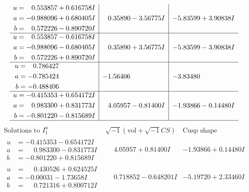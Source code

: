 \documentclass[1p]{elsarticle_modified}
\theoremstyle{definition}
\newcommand{\I}{\sqrt{-1}}
\begin{document}
$$\begin{array}{c|c|c}
\begin{aligned}
u &= \phantom{-}0.553857 + 0.616758 I \\
a &= -0.988096 + 0.680405 I \\
b &= \phantom{-}0.572226 - 0.890720 I\end{aligned}
 & \phantom{-}0.35890 - 3.56775 I & -5.83599 + 3.90838 I \\ \hline\begin{aligned}
u &= \phantom{-}0.553857 - 0.616758 I \\
a &= -0.988096 - 0.680405 I \\
b &= \phantom{-}0.572226 + 0.890720 I\end{aligned}
 & \phantom{-}0.35890 + 3.56775 I & -5.83599 - 3.90838 I \\ \hline\begin{aligned}
u &= \phantom{-}0.786427\phantom{ +0.000000I} \\
a &= -0.785424\phantom{ +0.000000I} \\
b &= -0.488406\phantom{ +0.000000I}\end{aligned}
 & -1.56406\phantom{ +0.000000I} & -3.83480\phantom{ +0.000000I} \\ \hline\begin{aligned}
u &= -0.415353 + 0.654172 I \\
a &= \phantom{-}0.983300 + 0.831773 I \\
b &= -0.801220 - 0.815689 I\end{aligned}
 & \phantom{-}4.05957 - 0.81400 I & -1.93866 - 0.14480 I\\
 \hline 
 \end{array}$$\newpage$$\begin{array}{c|c|c}  
\text{Solutions to }I^u_{1}& \I (\text{vol} + \sqrt{-1}CS) & \text{Cusp shape}\\
 \hline 
\begin{aligned}
u &= -0.415353 - 0.654172 I \\
a &= \phantom{-}0.983300 - 0.831773 I \\
b &= -0.801220 + 0.815689 I\end{aligned}
 & \phantom{-}4.05957 + 0.81400 I & -1.93866 + 0.14480 I \\ \hline\begin{aligned}
u &= \phantom{-}0.430526 + 0.624525 I \\
a &= -0.00031 - 1.73658 I \\
b &= \phantom{-}0.721316 + 0.800712 I\end{aligned}
 & \phantom{-}0.718852 - 0.648201 I & -5.19720 + 2.33460 I \\ \hline\begin{aligned}

\end{aligned}
\end{array}$$
\end{document}

